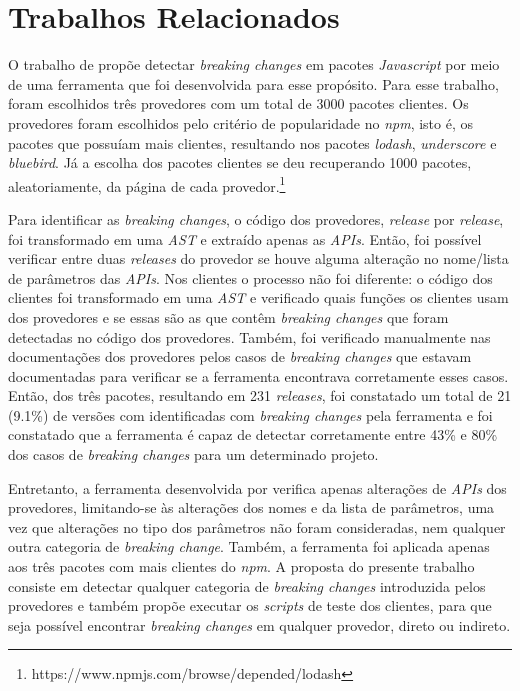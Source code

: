 \section{Trabalhos Relacionados}
\label{sec:related_works}

O trabalho de  propõe detectar \textit{breaking changes} em pacotes \textit{Javascript} por meio de uma ferramenta que foi desenvolvida para esse propósito. Para esse trabalho, foram escolhidos três provedores com um total de 3000 pacotes clientes. Os provedores foram escolhidos pelo critério de popularidade no \textit{npm}, isto é, os pacotes que possuíam mais clientes, resultando nos pacotes \textit{lodash}, \textit{underscore} e \textit{bluebird}. Já a escolha dos pacotes clientes se deu recuperando 1000 pacotes, aleatoriamente, da página de cada provedor.\footnote{https://www.npmjs.com/browse/depended/lodash}

Para identificar as \textit{breaking changes}, o código dos provedores, \textit{release} por \textit{release}, foi transformado em uma \textit{AST} e extraído apenas as \textit{APIs}. Então, foi possível verificar entre duas \textit{releases} do provedor se houve alguma alteração no nome/lista de parâmetros das \textit{APIs}. Nos clientes o processo não foi diferente: o código dos clientes foi transformado em uma \textit{AST} e verificado quais funções os clientes usam dos provedores e se essas são as que contêm \textit{breaking changes} que foram detectadas no código dos provedores. Também, foi verificado manualmente nas documentações dos provedores pelos casos de \textit{breaking changes} que estavam documentadas para verificar se a ferramenta encontrava corretamente esses casos. Então, dos três pacotes, resultando em 231 \textit{releases}, foi constatado um total de 21 (9.1\%) de versões com identificadas com \textit{breaking changes} pela ferramenta e foi constatado que a ferramenta é capaz de detectar corretamente entre 43\% e 80\% dos casos de \textit{breaking changes} para um determinado projeto.

Entretanto, a ferramenta desenvolvida por  verifica apenas alterações de \textit{APIs} dos provedores, limitando-se às alterações dos nomes e da lista de parâmetros, uma vez que alterações no tipo dos parâmetros não foram consideradas, nem qualquer outra categoria de \textit{breaking change}. Também, a ferramenta foi aplicada apenas aos três pacotes com mais clientes do \textit{npm}. A proposta do presente trabalho consiste em detectar qualquer categoria de \textit{breaking changes} introduzida pelos provedores e também propõe executar os \textit{scripts} de teste dos clientes, para que seja possível encontrar \textit{breaking changes} em qualquer provedor, direto ou indireto.

